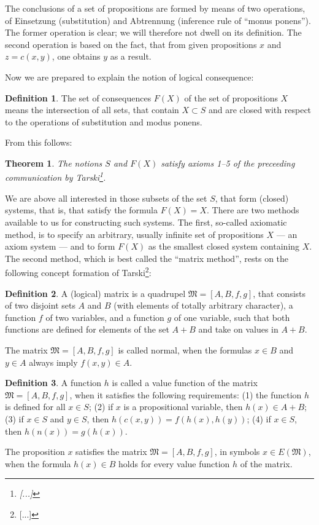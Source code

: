 \documentclass{article}
\newtheorem{theorem}{Theorem}
\theoremstyle{definition}
\newtheorem{definition}{Definition}
\begin{document}
The conclusions of a set of propositions are formed by means of two operations, of Einsetzung (substitution) and Abtrennung (inference rule of ``monus ponens''). The former operation is clear; we will therefore not dwell on its definition. The second operation is based on the fact, that from given propositions $x$ and $z=c(x,y)$, one obtains $y$ as a result.

Now we are prepared to explain the notion of logical consequence:
\begin{definition}
  The set of consequences $F(X)$ of the set of propositions $X$ means the intersection of all sets, that contain $X\subset S$ and are closed with respect to the operations of substitution and modus ponens.
\end{definition}

From this follows:
\begin{theorem}
  The notions $S$ and $F(X)$ satisfy axioms 1--5 of the preceeding communication by Tarski\footnote{[...]}.
\end{theorem}

We are above all interested in those subsets of the set $S$, that form (closed) systems, that is, that satisfy the formula $F(X)=X$. There are two methods available to us for constructing such systems. The first, so-called axiomatic method, is to specify an arbitrary, usually infinite set of propositions $X$ --- an axiom system --- and to form $F(X)$ as the smallest closed system containing $X$. The second method, which is best called the ``matrix method'', rests on the following concept formation of Tarski\footnote{[...]}:
\begin{definition}
  A (logical) matrix is a quadrupel $\mathfrak{M}=[A,B,f,g]$, that consists of two disjoint sets $A$ and $B$ (with elements of totally arbitrary character), a function $f$ of two variables, and a function $g$ of one variable, such that both functions are defined for elements of the set $A+B$ and take on values in $A+B$.

  The matrix $\mathfrak{M}=[A,B,f,g]$ is called normal, when the formulas $x\in B$ and $y\in A$ always imply $f(x,y)\in A$.
\end{definition}

\begin{definition}
  A function $h$ is called a value function of the matrix $\mathfrak{M}=[A,B,f,g]$, when it satisfies the following requirements: (1) the function $h$ is defined for all $x\in S$; (2) if $x$ is a propositional variable, then $h(x)\in A+B$; (3) if $x\in S$ and $y\in S$, then $h(c(x,y)) = f(h(x), h(y))$; (4) if $x\in S$, then $h(n(x)) = g(h(x))$.

  The proposition $x$ satisfies the matrix $\mathfrak{M}=[A,B,f,g]$, in symbols $x\in E(\mathfrak{M})$, when the formula $h(x)\in B$ holds for every value function $h$ of the matrix.
\end{definition}
\end{document}
